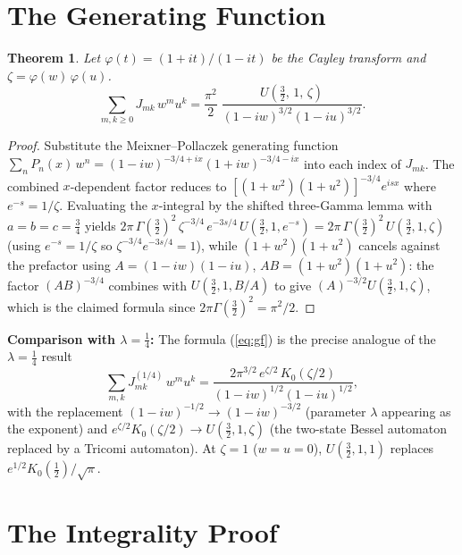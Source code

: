 \documentclass[11pt,a4paper]{article}
\newtheorem{theorem}{Theorem}[section]
\begin{document}
\section{The Generating Function}

\begin{theorem}\label{thm:gf}
Let $\varphi(t) = (1+it)/(1-it)$ be the Cayley transform and
$\zeta = \varphi(w)\,\varphi(u)$.
\begin{equation}\label{eq:gf}
  \sum_{m,k \ge 0} J_{mk}\,w^m u^k
  = \frac{\pi^2}{2}\;\frac{U\!\left(\tfrac32,\,1,\,\zeta\right)}{(1-iw)^{3/2}(1-iu)^{3/2}}.
\end{equation}
\end{theorem}

\begin{proof}
Substitute the Meixner--Pollaczek generating function
$\sum_n P_n(x)\,w^n = (1-iw)^{-3/4+ix}(1+iw)^{-3/4-ix}$
into each index of $J_{mk}$.
The combined $x$-dependent factor reduces to
$[(1+w^2)(1+u^2)]^{-3/4} e^{isx}$ where $e^{-s} = 1/\zeta$.
Evaluating the $x$-integral by the shifted three-Gamma lemma with $a=b=c=\tfrac34$
yields $2\pi\,\Gamma(\tfrac32)^2\,\zeta^{-3/4}\,e^{-3s/4}\,U(\tfrac32,1,e^{-s})
= 2\pi\,\Gamma(\tfrac32)^2\,U(\tfrac32,1,\zeta)$
(using $e^{-s} = 1/\zeta$ so $\zeta^{-3/4} e^{-3s/4} = 1$),
while $(1+w^2)(1+u^2)$ cancels against the prefactor using
$A = (1-iw)(1-iu)$, $AB = (1+w^2)(1+u^2)$: the factor $(AB)^{-3/4}$
combines with $U(\tfrac32,1,B/A)$ to give $(A)^{-3/2} U(\tfrac32,1,\zeta)$,
which is the claimed formula since $2\pi\Gamma(\tfrac32)^2 = \pi^2/2$.
\end{proof}

\noindent
\textbf{Comparison with $\lambda = \tfrac14$:}
The formula (\ref{eq:gf}) is the precise analogue of the $\lambda = \tfrac14$ result
\[
  \sum_{m,k} J_{mk}^{(1/4)}\,w^m u^k
  = \frac{2\pi^{3/2}\,e^{\zeta/2}\,K_0(\zeta/2)}{(1-iw)^{1/2}(1-iu)^{1/2}},
\]
with the replacement $(1-iw)^{-1/2} \to (1-iw)^{-3/2}$ (parameter $\lambda$ appearing
as the exponent) and $e^{\zeta/2} K_0(\zeta/2) \to U(\tfrac32, 1, \zeta)$
(the two-state Bessel automaton replaced by a Tricomi automaton).
At $\zeta = 1$ ($w = u = 0$), $U(\tfrac32, 1, 1)$ replaces $e^{1/2} K_0(\tfrac12)/\sqrt\pi$.

\section{The Integrality Proof}
\end{document}
